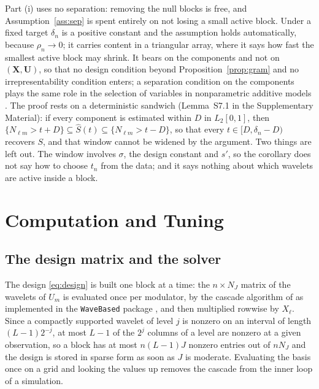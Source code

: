 \documentclass[12pt]{article} %
\theoremstyle{definition}
\newcommand{\cv}{\ell}
\newcommand{\md}{m}
\newcommand{\lev}{j}
\newcommand{\NJ}{N_{J}}
\newcommand{\bX}{\mathbf{X}}
\newcommand{\bU}{\mathbf{U}}
\newcommand{\seff}{s'}
\begin{document}
{Part (i) uses no separation: removing the null blocks is free, and
Assumption~\ref{ass:sep} is spent entirely on not losing a small active block.
Under a fixed target $\delta_n$ is a positive constant and the assumption holds
automatically, because $\rho_n \to 0$; it carries content in a triangular
array, where it says how fast the smallest active block may shrink. It bears
on the components and not on $(\bX,\bU)$, so that no design condition beyond
Proposition~\ref{prop:gram} and no irrepresentability condition enters; a
separation condition on the components plays the same role in the selection
of variables in nonparametric additive models \citep{Huang-Horowitz-Wei-2010}.
The proof rests on a deterministic sandwich (Lemma~S7.1 in the Supplementary
Material): if every component is estimated within $D$ in $L_2[0,1]$, then
$\{N_{\cv\md} > t + D\} \subseteq \widehat{S}(t) \subseteq
\{N_{\cv\md} > t - D\}$, so that every $t \in [D, \delta_n - D)$ recovers $S$,
and that window cannot be widened by the argument. Two things are left out.
The window involves $\sigma$, the design constant and $\seff$, so the
corollary does not say how to choose $t_n$ from the data; and it says nothing
about which wavelets are active inside a block.
}

\section{Computation and Tuning}
\label{sec:computation}

\subsection{The design matrix and the solver}
\label{sec:solver}

The design \eqref{eq:design} is built one block at a time: the $n \times \NJ$
matrix of the wavelets of $U_{\md}$ is evaluated once per modulator, by the
cascade algorithm of \citet{Daubechies-Lagarias-1991}\textcolor{colR1}{ as implemented in
the \texttt{WaveBased} package \citep{Montoril-WaveBased-2026}}, and then multiplied
rowwise by $X_{\cv}$. Since a compactly supported wavelet of level $\lev$ is
nonzero on an interval of length $(L-1)2^{-\lev}$, at most $L-1$ of the
$2^{\lev}$ columns of a level are nonzero at a given observation, so a block
has at most $n(L-1)J$ nonzero entries out of $n\NJ$ and the design is stored in
sparse form as soon as $J$ is moderate. Evaluating the basis once on a grid and
looking the values up removes the cascade from the inner loop of a
simulation.
\end{document}
